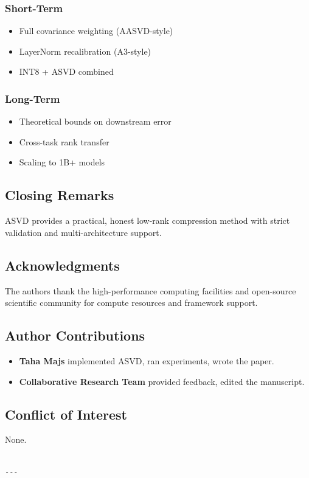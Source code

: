 \subsubsection{Short-Term}
\begin{itemize}
\item Full covariance weighting (AASVD-style)
\item LayerNorm recalibration (A3-style)
\item INT8 + ASVD combined

\end{itemize}
\subsubsection{Long-Term}
\begin{itemize}
\item Theoretical bounds on downstream error
\item Cross-task rank transfer
\item Scaling to 1B+ models

\end{itemize}
\subsection{Closing Remarks}

ASVD provides a practical, honest low-rank compression method with strict 
validation and multi-architecture support.

\subsection{Acknowledgments}

The authors thank the high-performance computing facilities and open-source scientific community for compute resources and framework support.

\subsection{Author Contributions}

\begin{itemize}
\item \textbf{Taha Majs} implemented ASVD, ran experiments, wrote the paper.
\item \textbf{Collaborative Research Team} provided feedback, edited the manuscript.

\end{itemize}
\subsection{Conflict of Interest}

None.
\begin{lstlisting}

---
\end{lstlisting}